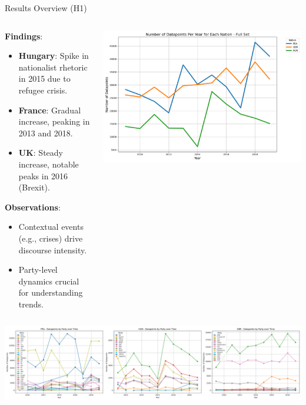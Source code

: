 \documentclass[8pt]{beamer}
\begin{document}
\begin{frame}{Results Overview (H1)}
    \begin{columns}[T] %
        \begin{column}{0.5\textwidth} %
        \textbf{Findings}:
            \begin{itemize}
                \item \textbf{Hungary}: Spike in nationalist
                rhetoric in 2015 due to refugee
                crisis.
                \item \textbf{France}: Gradual increase, peaking
                in 2013 and 2018.
                \item  \textbf{UK}: Steady increase, notable peaks
                in 2016 (Brexit).
                
            \end{itemize}

        \textbf{Observations}:
        \begin{itemize}
            \item Contextual events (e.g., crises)
            drive discourse intensity.
            \item  Party-level dynamics crucial for
            understanding trends.
        \end{itemize}
        \end{column}
        \begin{column}{0.5\textwidth} %
            \centering
            \includegraphics[width=\textwidth]{img/topicdatapoints_per_year.png}
            
        \end{column}
    \end{columns}

    \includegraphics[width=\textwidth]{img/datapoints_by_party_and_year_3_columns.png}
\end{frame}
\end{document}
